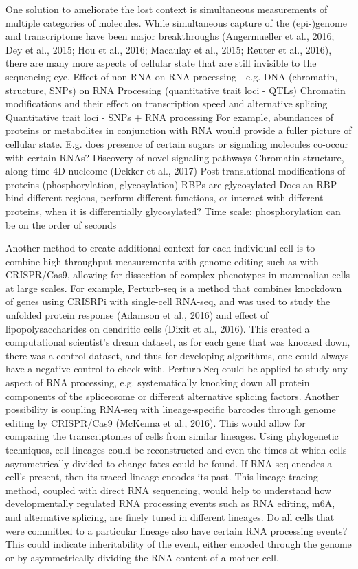 One solution to ameliorate the lost context is simultaneous measurements of multiple categories of molecules. While simultaneous capture of the (epi-)genome and transcriptome have been major breakthroughs (Angermueller et al., 2016; Dey et al., 2015; Hou et al., 2016; Macaulay et al., 2015; Reuter et al., 2016), there are many more aspects of cellular state that are still invisible to the sequencing eye. 
Effect of non-RNA on RNA processing - e.g. DNA (chromatin, structure, SNPs) on RNA Processing (quantitative trait loci - QTLs)
Chromatin modifications and their effect on transcription speed and alternative splicing
Quantitative trait loci - SNPs + RNA processing
For example, abundances of proteins or metabolites in conjunction with RNA would provide a fuller picture of cellular state.
E.g. does presence of certain sugars or signaling molecules co-occur with certain RNAs? Discovery of novel signaling pathways
Chromatin structure, along time 4D nucleome (Dekker et al., 2017)
Post-translational modifications of proteins (phosphorylation, glycosylation)
RBPs are glycosylated
Does an RBP bind different regions, perform different functions, or interact with different proteins, when it is differentially glycosylated?
Time scale: phosphorylation can be on the order of seconds

Another method to create additional context for each individual cell is to combine high-throughput measurements with genome editing such as with CRISPR/Cas9, allowing for dissection of complex phenotypes in mammalian cells at large scales. For example, Perturb-seq is a method that combines knockdown of genes using CRISRPi with single-cell RNA-seq, and was used to study the unfolded protein response (Adamson et al., 2016) and effect of lipopolysaccharides on dendritic cells (Dixit et al., 2016). This created a computational scientist’s dream dataset, as for each gene that was knocked down, there was a control dataset, and thus for developing algorithms, one could always have a negative control to check with. Perturb-Seq could be applied to study any aspect of RNA processing, e.g. systematically knocking down all protein components of the spliceosome or different alternative splicing factors. 
Another possibility is coupling RNA-seq with lineage-specific barcodes through genome editing by CRISPR/Cas9 (McKenna et al., 2016). This would allow for comparing the transcriptomes of cells from similar lineages. Using phylogenetic techniques, cell lineages could be reconstructed and even the times at which cells asymmetrically divided to change fates could be found. If RNA-seq encodes a cell’s present, then its traced lineage encodes its past. This lineage tracing method, coupled with direct RNA sequencing, would help to understand how developmentally regulated RNA processing events such as RNA editing, m6A, and alternative splicing, are finely tuned in different lineages. Do all cells that were committed to a particular lineage also have certain RNA processing events? This could indicate inheritability of the event, either encoded through the genome or by asymmetrically dividing the RNA content of a mother cell.


